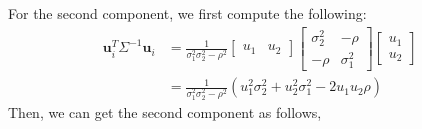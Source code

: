 \documentclass[aoas,authoryear, preprint]{imsart}
\numberwithin{equation}{section}
\theoremstyle{plain}
\begin{document}
For the second component, we first compute the following:
\begin{align*}
\bm{u}_i^T\Sigma^{-1}\bm{u}_i &= \frac{1}{\sigma_1^2 \sigma_2^2 - \rho^2}\begin{bmatrix}u_1 & u_2 \end{bmatrix}  \begin{bmatrix} \sigma_2^2 & -\rho \\ -\rho & \sigma_1^2 \end{bmatrix}  \begin{bmatrix}u_1\\ u_2 \end{bmatrix}\\
	&= \frac{1}{\sigma_1^2\sigma_2^2 - \rho^2} ( u_1^2\sigma_2^2 + u_2^2\sigma_1^2 - 2u_1u_2\rho)
\end{align*}
Then, we can get the second component as follows,
\end{document}
